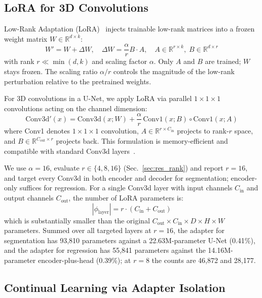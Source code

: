 \documentclass[journal,twoside,web]{ieeecolor}
\begin{document}
\subsection{LoRA for 3D Convolutions}
\label{sec:lora}

Low-Rank Adaptation (LoRA)~\cite{hu2022lora} injects trainable low-rank matrices into a frozen weight matrix $W \in \mathbb{R}^{d \times k}$:
\begin{equation}
W' = W + \Delta W, \quad \Delta W = \frac{\alpha}{r} B \cdot A, \quad A \in \mathbb{R}^{r \times k}, \; B \in \mathbb{R}^{d \times r}
\label{eq:lora}
\end{equation}
with rank $r \ll \min(d,k)$ and scaling factor $\alpha$. Only $A$ and $B$ are trained; $W$ stays frozen. The scaling ratio $\alpha/r$ controls the magnitude of the low-rank perturbation relative to the pretrained weights.

For 3D convolutions in a U-Net, we apply LoRA via parallel $1\times1\times1$ convolutions acting on the channel dimension:
\begin{equation}
\text{Conv3d}'(x) = \text{Conv3d}(x; W) + \frac{\alpha}{r} \, \text{Conv1}(x; B) \circ \text{Conv1}(x; A)
\label{eq:lora3d}
\end{equation}
where Conv1 denotes $1\times1\times1$ convolution, $A \in \mathbb{R}^{r \times C_{\text{in}}}$ projects to rank-$r$ space, and $B \in \mathbb{R}^{C_{\text{out}} \times r}$ projects back. This formulation is memory-efficient and compatible with standard Conv3d layers~\cite{peft}.

We use $\alpha=16$, evaluate $r \in \{4, 8, 16\}$ (Sec.~\ref{sec:res_rank}) and report $r=16$, and target every Conv3d in both encoder and decoder for segmentation; encoder-only suffices for regression. For a single Conv3d layer with input channels $C_{\text{in}}$ and output channels $C_{\text{out}}$, the number of LoRA parameters is:
\begin{equation}
|\phi_{\text{layer}}| = r \cdot (C_{\text{in}} + C_{\text{out}})
\label{eq:param_count}
\end{equation}
which is substantially smaller than the original $C_{\text{out}} \times C_{\text{in}} \times D \times H \times W$ parameters. Summed over all targeted layers at $r=16$, the adapter for segmentation has 93,810 parameters against a 22.63M-parameter U-Net (0.41\%), and the adapter for regression has 55,841 parameters against the 14.16M-parameter encoder-plus-head (0.39\%); at $r=8$ the counts are 46,872 and 28,177.

\subsection{Continual Learning via Adapter Isolation}
\label{sec:continual}
\end{document}
